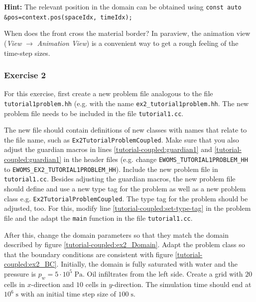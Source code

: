 \begin{enumerate}
\textbf{Hint:} The relevant position in the domain can be obtained using
\texttt{const auto \&pos=context.pos(spaceIdx, timeIdx);}

When does the front cross the material border? In paraview, the
animation view (\textit{View} $\rightarrow$ \textit{Animation View})
is a convenient way to get a rough feeling of the time-step sizes.
\end{enumerate}

\subsubsection{Exercise 2}

For this exercise, first create a new problem file analogous to the
file \texttt{tutorial1problem.hh} (e.g. with the name
\texttt{ex2\_tutorial1problem.hh}. The new problem
file needs to be included in the file \texttt{tutorial1.cc}.

The new file should contain definitions of new classes with names that
relate to the file name, such as
\texttt{Ex2TutorialProblemCoupled}. Make sure that you also adjust the
guardian macros in lines \ref{tutorial-coupled:guardian1} and
\ref{tutorial-coupled:guardian1} in the header files (e.g. change
\mbox{\texttt{EWOMS\_TUTORIAL1PROBLEM\_HH}} to
\mbox{\texttt{EWOMS\_EX2\_TUTORIAL1PROBLEM\_HH}}). Include the
new problem file in \texttt{tutorial1.cc}.  Besides adjusting
the guardian macros, the new problem file should define and use a new
type tag for the problem as well as a new problem class
e.g. \mbox{\texttt{Ex2TutorialProblemCoupled}}. The type tag for the
problem should be adjusted, too. For this, modify line
\ref{tutorial-coupled:set-type-tag} in the problem file and the adapt
the \texttt{main} function in the file \texttt{tutorial1.cc}.

After this, change the domain parameters so that they match the domain
described by figure \ref{tutorial-coupled:ex2_Domain}. Adapt the
problem class so that the boundary conditions are consistent with
figure \ref{tutorial-coupled:ex2_BC}. Initially, the domain is fully
saturated with water and the pressure is $p_w = 5\cdot
10^5\;\text{Pa}$. Oil infiltrates from the left side. Create a grid
with $20$ cells in $x$-direction and $10$ cells in $y$-direction. The
simulation time should end at $10^6\;\text{s}$ with an initial time
step size of $100\;\text{s}$.


